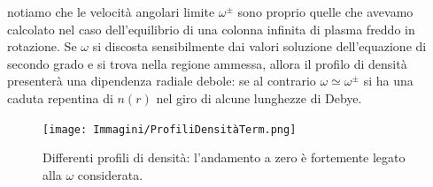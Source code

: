 notiamo che le velocità angolari limite $\omega^\pm$ sono proprio quelle che avevamo calcolato nel caso dell'equilibrio di una 
colonna infinita di plasma freddo in rotazione. Se $\omega$ si discosta sensibilmente dai valori soluzione dell'equazione di secondo 
grado e si trova nella regione ammessa, allora il profilo di densità presenterà una dipendenza radiale debole: se al contrario 
$\omega \simeq \omega^\pm$ si ha una caduta repentina di $n\left(r\right)$ nel giro di alcune lunghezze di Debye.
\begin{figure}[H]
    \centering
    \texttt{[image: Immagini/ProfiliDensitàTerm.png]}
    \caption{Differenti profili di densità: l'andamento a zero è fortemente legato alla $\omega$ considerata. }
    \label{figure: CurvaEpitrocoide}
\end{figure}
